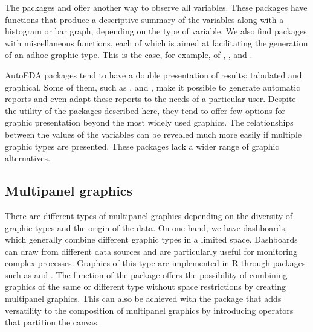 The packages  \citep{Helby2019} and 
\citep{Comtois2019} offer another way to observe all variables. These
packages have functions that produce a descriptive summary of the
variables along with a histogram or bar graph, depending on the type of
variable. We also find packages with miscellaneous functions, each of
which is aimed at facilitating the generation of an adhoc graphic type.
This is the case, for example, of , ,
 and .

AutoEDA packages tend to have a double presentation of results:
tabulated and graphical. Some of them, such as ,
 and , make it possible to generate
automatic reports and even adapt these reports to the needs of a
particular user. Despite the utility of the packages described here,
they tend to offer few options for graphic presentation beyond the most
widely used graphics. The relationships between the values of the
variables can be revealed much more easily if multiple graphic types are
presented. These packages lack a wider range of graphic alternatives.

\hypertarget{multipanel-graphics}{%
	\subsection{Multipanel graphics}\label{multipanel-graphics}}

There are different types of multipanel graphics depending on the
diversity of graphic types and the origin of the data. On one hand, we
have dashboards, which generally combine different graphic types in a
limited space. Dashboards can draw from different data sources and are
particularly useful for monitoring complex processes. Graphics of this
type are implemented in R through packages such as
 \citep{Chang2018} and 
\citep{Iannone2018}. The  function of the package
 \citep{Wilke2019} offers the possibility of combining
graphics of the same or different type without space restrictions by
creating multipanel graphics. This can also be achieved with the
 package \citep{LinPedersen2019} that adds versatility to
the composition of multipanel graphics by introducing operators that
partition the canvas.

